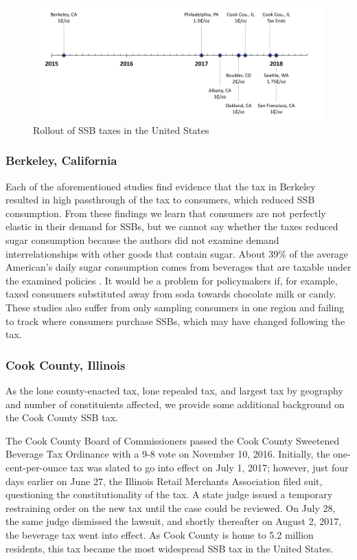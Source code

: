 \documentclass[12pt]{article}
\begin{document}
\begin{figure}[t]\centering
\includegraphics[width = \textwidth]{../figures/taxtimeline.png}
\caption{Rollout of SSB taxes in the United States \label{taxtimeline}}
\end{figure}

\subsubsection{Berkeley, California}

Each of the aforementioned studies find evidence that the tax in Berkeley resulted in high passthrough of the tax to consumers, which reduced SSB consumption. From these findings we learn that consumers are not perfectly elastic in their demand for SSBs, but we cannot say whether the taxes reduced sugar consumption because the authors did not examine demand interrelationships with other goods that contain sugar. About 39\% of the average American's daily sugar consumption comes from beverages that are taxable under the examined policies \parencite{dietary2015dietary}. It would be a problem for policymakers if, for example, taxed consumers substituted away from soda towards chocolate milk or candy. These studies also suffer from only sampling consumers in one region and failing to track where consumers purchase SSBs, which may have changed following the tax.

\subsubsection{Cook County, Illinois}

As the lone county-enacted tax, lone repealed tax, and largest tax by geography and number of constituients affected, we provide some additional background on the Cook County SSB tax.

The Cook County Board of Commissioners passed the Cook County Sweetened Beverage Tax Ordinance with a 9-8 vote on November 10, 2016. Initially, the one-cent-per-ounce tax was slated to go into effect on July 1, 2017; however, just four days earlier on June 27, the Illinois Retail Merchants Association filed suit, questioning the constitutionality of the tax. A state judge issued a temporary restraining order on the new tax until the case could be reviewed. On July 28, the same judge dismissed the lawsuit, and shortly thereafter on August 2, 2017, the beverage tax went into effect. As Cook County is home to 5.2 million residents, this tax became the most widespread SSB tax in the United States.
\end{document}
